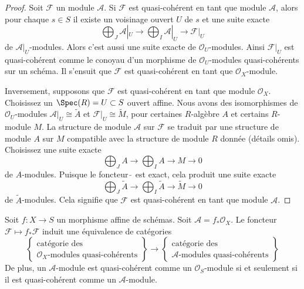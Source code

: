 \begin{proof}
Soit $\mathcal{F}$ un module $\mathcal{A}$. Si $\mathcal{F}$
est quasi-cohérent en tant que module $\mathcal{A}$, alors pour chaque
$s \in S$ il existe un voisinage ouvert $U$ de $s$
et une suite exacte
$$
\bigoplus\nolimits_J\mathcal{A}|_U\to
\bigoplus\nolimits_I\mathcal{A}|_U\to
\mathcal{F}|_U
$$
de $\mathcal{A}|_U$-modules. Alors
c'est aussi une suite exacte de $\mathcal{O}_U$-modules. Ainsi
$\mathcal{F}|_U$ est quasi-cohérent comme le conoyau d'un morphisme de $\mathcal{O}_U$-modules
quasi-cohérents sur un schéma. Il s'ensuit que
$\mathcal{F}$ est quasi-cohérent en tant que $\mathcal{O}_X$-module.

\medskip\noindent
Inversement, supposons que $\mathcal{F}$ est quasi-cohérent en tant que module $\mathcal{O}_X$.
Choisissez un $\Spec(R) = U \subset S$ ouvert affine. Nous avons des isomorphismes
de $\mathcal{O}_U$-modules $\mathcal{A}|_U \cong \widetilde{A}$ et $\mathcal{F}|_U \cong \widetilde{M}$, pour certaines $R$-algèbre
$A$ et certains $R$-module $M$.
La structure de module $\mathcal{A}$ sur $\mathcal{F}$ se traduit par une structure
de module $A$ sur $M$ compatible avec la structure
de module $R$ donnée (détails omis). Choisissez une suite exacte
$$
\bigoplus\nolimits_J A \to
\bigoplus\nolimits_I A \to
M \to 0
$$
de $A$-modules. Puisque le foncteur $\widetilde{\ }$ est exact, cela
produit une suite exacte
$$
\bigoplus\nolimits_J \widetilde{A}\to
\bigoplus\nolimits_I \widetilde{A}\to
\widetilde{M} \to 0
$$
de $\widetilde{A}$-modules. Cela signifie que $\mathcal{F}$
est quasi-cohérent en tant que module $\mathcal{A}$.
\end{proof}

\begin{lemma}
\label{lemma-affine-equivalence-modules}
Soit $f : X \to S$ un morphisme affine de
schémas. Soit $\mathcal{A} = f_*\mathcal{O}_X$.
Le foncteur $\mathcal{F} \mapsto f_*\mathcal{F}$ induit une équivalence
de catégories
$$
\left\{
\begin{matrix}
\text{catégorie des}\\
\mathcal{O}_X\text{-modules quasi-cohérents}
\end{matrix}
\right\}
\longrightarrow
\left\{
\begin{matrix}
\text{catégorie des}\\
\mathcal{A}\text{-modules quasi-cohérents}
\end{matrix}
\right\}
$$
De plus, un $\mathcal{A}$-module est quasi-cohérent
comme un $\mathcal{O}_S$-module si et seulement si il
est quasi-cohérent comme un $\mathcal{A}$-module.
\end{lemma}

